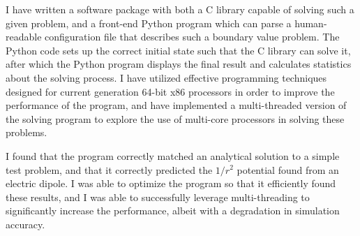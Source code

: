 \documentclass[12pt]{article}
\begin{document}
I have written a software package with both a C library capable of solving such a given problem, and a front-end
Python program which can parse a human-readable configuration file that describes such a boundary value problem. 
The Python code sets up the correct initial state such that the C library can solve it, after which the Python program
displays the final result and calculates statistics about the solving process. I have utilized effective
programming techniques designed for current generation 64-bit x86 processors in order to improve
the performance of the program, and have implemented a multi-threaded version of the solving program
to explore the use of multi-core processors in solving these problems.

I found that the program correctly matched an analytical solution to a simple test problem, and that it correctly
predicted the $1/r^2$ potential found from an electric dipole. I was able to optimize the program so that it
efficiently found these results, and I was able to successfully leverage multi-threading to significantly increase
the performance, albeit with a degradation in simulation accuracy.

\clearpage
\doublespacing







\end{document}
